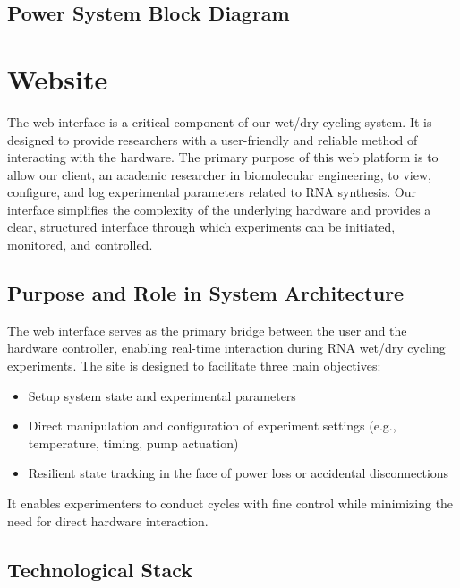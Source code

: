 \documentclass[12pt]{article}
\begin{document}
    \subsection{Power System Block Diagram}




    \section{Website}

            The web interface is a critical component of our wet/dry cycling system. It is designed to provide researchers with a user-friendly and reliable method of interacting with the hardware. The primary purpose of this web platform is to allow our client, an academic researcher in biomolecular engineering, to view, configure, and log experimental parameters related to RNA synthesis. Our interface simplifies the complexity of the underlying hardware and provides a clear, structured interface through which experiments can be initiated, monitored, and controlled.
            
            \subsection{Purpose and Role in System Architecture}
            
            The web interface serves as the primary bridge between the user and the hardware controller, enabling real-time interaction during RNA wet/dry cycling experiments. The site is designed to facilitate three main objectives:
\begin{itemize}
    \item Setup system state and experimental parameters
    \item Direct manipulation and configuration of experiment settings (e.g., temperature, timing, pump actuation)
    \item Resilient state tracking in the face of power loss or accidental disconnections
\end{itemize}
It enables experimenters to conduct cycles with fine control while minimizing the need for direct hardware interaction.
            
            \subsection{Technological Stack}
            
\end{document}
